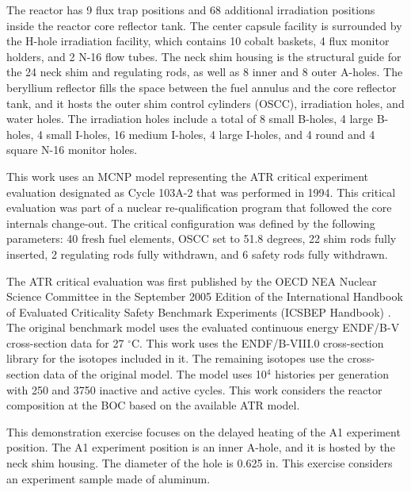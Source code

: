 \documentclass{style/nseJournal}
\begin{document}
The reactor has 9 flux trap positions and 68 additional irradiation positions inside the reactor core reflector tank.
The center capsule facility is surrounded by the H-hole irradiation facility, which contains 10 cobalt baskets, 4 flux monitor holders, and 2 N-16 flow tubes.
The neck shim housing is the structural guide for the 24 neck shim and regulating rods, as well as 8 inner and 8 outer A-holes.
The beryllium reflector fills the space between the fuel annulus and the core reflector tank, and it hosts the outer shim control cylinders (OSCC), irradiation holes, and water holes.
The irradiation holes include a total of 8 small B-holes, 4 large B-holes, 4 small I-holes, 16 medium I-holes, 4 large I-holes, and 4 round and 4 square N-16 monitor holes.

This work uses an MCNP model representing the ATR critical experiment evaluation designated as Cycle 103A-2 that was performed in 1994.
This critical evaluation was part of a nuclear re-qualification program that followed the core internals change-out.
The critical configuration was defined by the following parameters: 40 fresh fuel elements, OSCC set to 51.8 degrees, 22 shim rods fully inserted, 2 regulating rods fully withdrawn, and 6 safety rods fully withdrawn.

The ATR critical evaluation was first published by the OECD NEA Nuclear Science Committee in the September 2005 Edition of the International Handbook of Evaluated Criticality Safety Benchmark Experiments (ICSBEP Handbook) \cite{ICSBEP}.
The original benchmark model uses the evaluated continuous energy ENDF/B-V cross-section data for 27 $^{\circ}$C.
This work uses the ENDF/B-VIII.0 cross-section library for the isotopes included in it.
The remaining isotopes use the cross-section data of the original model.
The model uses 10$^4$ histories per generation with 250 and 3750 inactive and active cycles.
This work considers the reactor composition at the \gls*{BOC} based on the available ATR model.

This demonstration exercise focuses on the delayed heating of the A1 experiment position.
The A1 experiment position is an inner A-hole, and it is hosted by the neck shim housing.
The diameter of the hole is 0.625 in.
This exercise considers an experiment sample made of aluminum.
\end{document}
